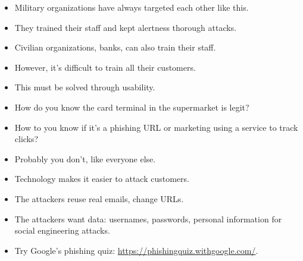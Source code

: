 \begin{frame}
  \begin{remark}
    \begin{itemize}
      \item Military organizations have always targeted each other like this.
      \item They trained their staff and kept alertness thorough attacks.

        \pause

      \item Civilian organizations, \eg banks, can also train their staff.

        \pause

      \item However, it's difficult to train all their customers.
      \item This must be solved through usability.
    \end{itemize}
  \end{remark}
\end{frame}

\begin{frame}
  \begin{question}
    \begin{itemize}
      \item How do you know the card terminal in the supermarket is legit?
      \item How to you know if it's a phishing URL or marketing using a service 
        to track clicks?
    \end{itemize}
  \end{question}

  \begin{remark}
    \begin{itemize}
      \item Probably you don't, like everyone else.
    \end{itemize}
  \end{remark}
\end{frame}

\begin{frame}
  \begin{summary}
    \begin{itemize}
      \item Technology makes it easier to attack customers.
      \item The attackers reuse real emails, change URLs.
      \item The attackers want data: usernames, passwords, personal information 
        for social engineering attacks.
    \end{itemize}
  \end{summary}

  \begin{remark}
    \begin{itemize}
      \item Try Google's phishing quiz: 
        \url{https://phishingquiz.withgoogle.com/}.
    \end{itemize}
  \end{remark}
\end{frame}

